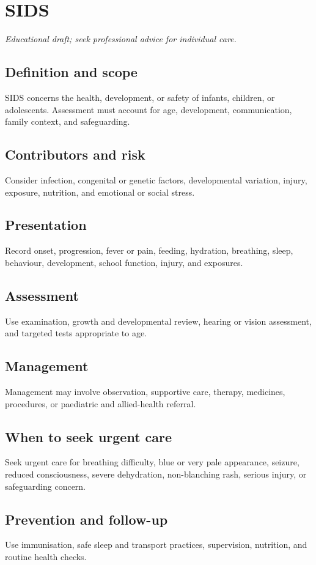 \chapter{SIDS}
\medskip
\noindent\textit{Educational draft; seek professional advice for individual care.}

\section*{Definition and scope}
SIDS concerns the health, development, or safety of infants, children, or adolescents. Assessment must account for age, development, communication, family context, and safeguarding.

\section*{Contributors and risk}
Consider infection, congenital or genetic factors, developmental variation, injury, exposure, nutrition, and emotional or social stress.

\section*{Presentation}
Record onset, progression, fever or pain, feeding, hydration, breathing, sleep, behaviour, development, school function, injury, and exposures.

\section*{Assessment}
Use examination, growth and developmental review, hearing or vision assessment, and targeted tests appropriate to age.

\section*{Management}
Management may involve observation, supportive care, therapy, medicines, procedures, or paediatric and allied-health referral.

\section*{When to seek urgent care}
Seek urgent care for breathing difficulty, blue or very pale appearance, seizure, reduced consciousness, severe dehydration, non-blanching rash, serious injury, or safeguarding concern.

\section*{Prevention and follow-up}
Use immunisation, safe sleep and transport practices, supervision, nutrition, and routine health checks.
